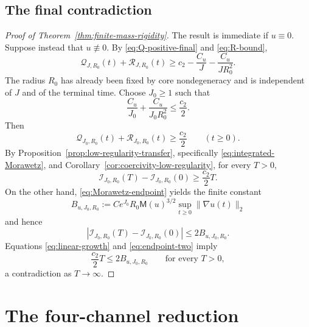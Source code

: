 \documentclass{interact}
\numberwithin{equation}{section}
\theoremstyle{plain}
\theoremstyle{definition}
\theoremstyle{remark}
\newcommand{\M}{\mathsf M}
\begin{document}
\subsection{The final contradiction}

\begin{proof}[Proof of Theorem~\ref{thm:finite-mass-rigidity}]
The result is immediate if $u\equiv0$. Suppose instead that $u\not\equiv0$. By \eqref{eq:Q-positive-final} and \eqref{eq:R-bound},
\[
 \mathcal Q_{J,R_0}(t)+\mathcal R_{J,R_0}(t)
 \ge c_2-\frac{C_u}{J}-\frac{C_u}{JR_0^2}.
\]
The radius $R_0$ has already been fixed by core nondegeneracy and is independent of $J$ and of the terminal time. Choose $J_0\ge1$ such that
\[
 \frac{C_u}{J_0}+\frac{C_u}{J_0R_0^2}\le\frac{c_2}{2}.
\]
Then
\[
 \mathcal Q_{J_0,R_0}(t)+\mathcal R_{J_0,R_0}(t)
 \ge\frac{c_2}{2}
 \qquad(t\ge0).
\]
By Proposition~\ref{prop:low-regularity-transfer}, specifically \eqref{eq:integrated-Morawetz}, and Corollary~\ref{cor:coercivity-low-regularity}, for every $T>0$,
\begin{equation}\label{eq:linear-growth}
 \mathcal I_{J_0,R_0}(T)-\mathcal I_{J_0,R_0}(0)
 \ge\frac{c_2}{2}T.
\end{equation}
On the other hand, \eqref{eq:Morawetz-endpoint} yields the finite constant
\[
 B_{u,J_0,R_0}
 :=Ce^{J_0}R_0\M(u)^{3/2}
 \sup_{t\ge0}\|\nabla u(t)\|_2
\]
and hence
\begin{equation}\label{eq:endpoint-two}
 |\mathcal I_{J_0,R_0}(T)-\mathcal I_{J_0,R_0}(0)|
 \le2B_{u,J_0,R_0}.
\end{equation}
Equations \eqref{eq:linear-growth} and \eqref{eq:endpoint-two} imply
\[
 \frac{c_2}{2}T\le2B_{u,J_0,R_0}
 \qquad\text{for every }T>0,
\]
a contradiction as $T\to\infty$.
\end{proof}

\section{The four-channel reduction}
\end{document}
